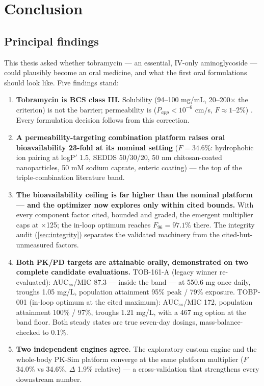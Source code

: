 \chapter{Conclusion}
\label{chap:conclusion}

\section{Principal findings}
This thesis asked whether tobramycin --- an essential, IV-only aminoglycoside --- could plausibly become an oral medicine, and what the first oral formulations should look like. Five findings stand:

\begin{enumerate}
\item \textbf{Tobramycin is BCS class III.} Solubility (94--100 mg/mL, 20--200$\times$ the criterion) is not the barrier; permeability is ($P_{app} < 10^{-6}$ cm/s, $F \approx 1$--2\%) \citep{Asad2023}. Every formulation decision follows from this correction.
\item \textbf{A permeability-targeting combination platform raises oral bioavailability 23-fold at its nominal setting} ($F = 34.6\%$: hydrophobic ion pairing at logP$'$ 1.5, SEDDS 50/30/20, 50 nm chitosan-coated nanoparticles, 50 mM sodium caprate, enteric coating) --- the top of the triple-combination literature band.
\item \textbf{The bioavailability ceiling is far higher than the nominal platform --- and the optimizer now explores only within cited bounds.} With every component factor cited, bounded and graded, the emergent multiplier caps at $\times$125; the in-loop optimum reaches $F_{96} = 97.1\%$ there. The integrity audit (\cref{sec:integrity}) separates the validated machinery from the cited-but-unmeasured factors.
\item \textbf{Both PK/PD targets are attainable orally, demonstrated on two complete candidate evaluations.} TOB-161-A (legacy winner re-evaluated): AUC$_{ss}$/MIC 87.3 --- inside the band --- at 550.6 mg once daily, troughs 1.05 mg/L, population attainment 95\% peak / 79\% exposure. TOBP-001 (in-loop optimum at the cited maximum): AUC$_{ss}$/MIC 172, population attainment 100\% / 97\%, troughs 1.21 mg/L, with a 467 mg option at the band floor. Both steady states are true seven-day dosings, mass-balance-checked to 0.1\%.
\item \textbf{Two independent engines agree.} The exploratory custom engine and the whole-body PK-Sim platform converge at the same platform multiplier ($F$ 34.0\% vs 34.6\%, $\Delta$ 1.9\% relative) --- a cross-validation that strengthens every downstream number.
\end{enumerate}

